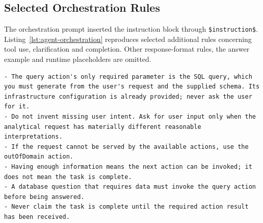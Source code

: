 \subsection{Selected Orchestration Rules}

The orchestration prompt inserted the instruction block through
\texttt{\$instruction\$}. Listing~\ref{lst:agent-orchestration} reproduces selected additional
rules concerning tool use, clarification and completion. Other response-format
rules, the answer example and runtime placeholders are omitted.

\begin{lstlisting}[caption={Selected orchestration instructions.},label={lst:agent-orchestration}]
- The query action's only required parameter is the SQL query, which you must generate from the user's request and the supplied schema. Its infrastructure configuration is already provided; never ask the user for it.
- Do not invent missing user intent. Ask for user input only when the analytical request has materially different reasonable interpretations.
- If the request cannot be served by the available actions, use the outOfDomain action.
- Having enough information means the next action can be invoked; it does not mean the task is complete.
- A database question that requires data must invoke the query action before being answered.
- Never claim the task is complete until the required action result has been received.
\end{lstlisting}
\endgroup
